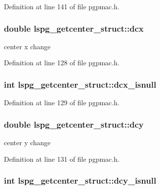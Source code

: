 Definition at line 141 of file pgpmac.h.\hypertarget{structlspg__getcenter__struct_ade0534056296e9ed568404c538be9227}{
\subsubsection[{dcx}]{\setlength{\rightskip}{0pt plus 5cm}double {\bf lspg\_\-getcenter\_\-struct::dcx}}}
\label{structlspg__getcenter__struct_ade0534056296e9ed568404c538be9227}


center x change 

Definition at line 128 of file pgpmac.h.\hypertarget{structlspg__getcenter__struct_aa404da85af654998f039c81a77626748}{
\subsubsection[{dcx\_\-isnull}]{\setlength{\rightskip}{0pt plus 5cm}int {\bf lspg\_\-getcenter\_\-struct::dcx\_\-isnull}}}
\label{structlspg__getcenter__struct_aa404da85af654998f039c81a77626748}


Definition at line 129 of file pgpmac.h.\hypertarget{structlspg__getcenter__struct_a55b1a488b714e6a40d8e06a6e182bd0a}{
\subsubsection[{dcy}]{\setlength{\rightskip}{0pt plus 5cm}double {\bf lspg\_\-getcenter\_\-struct::dcy}}}
\label{structlspg__getcenter__struct_a55b1a488b714e6a40d8e06a6e182bd0a}


center y change 

Definition at line 131 of file pgpmac.h.\hypertarget{structlspg__getcenter__struct_a352c48c8d443c52f18ebd13019d01684}{
\subsubsection[{dcy\_\-isnull}]{\setlength{\rightskip}{0pt plus 5cm}int {\bf lspg\_\-getcenter\_\-struct::dcy\_\-isnull}}}
\label{structlspg__getcenter__struct_a352c48c8d443c52f18ebd13019d01684}


